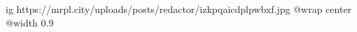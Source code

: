  
 
 
 
 

\ifcmt
  ig https://mrpl.city/uploads/posts/redactor/izkpqaicdplpwbxf.jpg
  @wrap center
  @width 0.9
\fi
